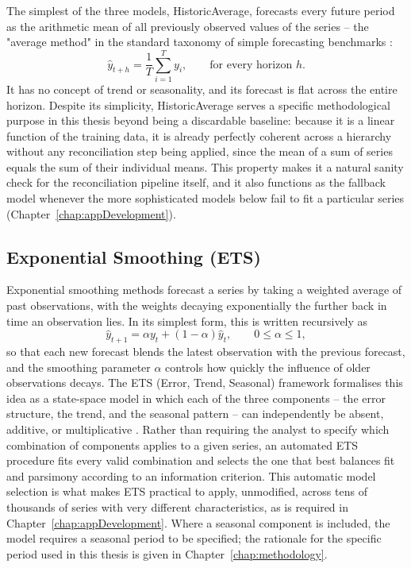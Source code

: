 The simplest of the three models, HistoricAverage, forecasts every future period as the arithmetic mean of all previously observed values of the series -- the "average method" in the standard taxonomy of simple forecasting benchmarks \cite{Hyndman:2018}:
\[
\hat{y}_{t+h} = \frac{1}{T}\sum_{i=1}^{T} y_i, \qquad \text{for every horizon } h.
\]
It has no concept of trend or seasonality, and its forecast is flat across the entire horizon. Despite its simplicity, HistoricAverage serves a specific methodological purpose in this thesis beyond being a discardable baseline: because it is a linear function of the training data, it is already perfectly coherent across a hierarchy without any reconciliation step being applied, since the mean of a sum of series equals the sum of their individual means. This property makes it a natural sanity check for the reconciliation pipeline itself, and it also functions as the fallback model whenever the more sophisticated models below fail to fit a particular series (Chapter~\ref{chap:appDevelopment}).

\subsection{Exponential Smoothing (ETS)}
\label{subsec:ets}

Exponential smoothing methods forecast a series by taking a weighted average of past observations, with the weights decaying exponentially the further back in time an observation lies. In its simplest form, this is written recursively as
\[
\hat{y}_{t+1} = \alpha y_t + (1-\alpha) \hat{y}_t , \qquad 0 \le \alpha \le 1,
\]
so that each new forecast blends the latest observation with the previous forecast, and the smoothing parameter $\alpha$ controls how quickly the influence of older observations decays. The ETS (Error, Trend, Seasonal) framework formalises this idea as a state-space model in which each of the three components -- the error structure, the trend, and the seasonal pattern -- can independently be absent, additive, or multiplicative \cite{Hyndman:2008}. Rather than requiring the analyst to specify which combination of components applies to a given series, an automated ETS procedure fits every valid combination and selects the one that best balances fit and parsimony according to an information criterion. This automatic model selection is what makes ETS practical to apply, unmodified, across tens of thousands of series with very different characteristics, as is required in Chapter~\ref{chap:appDevelopment}. Where a seasonal component is included, the model requires a seasonal period to be specified; the rationale for the specific period used in this thesis is given in Chapter~\ref{chap:methodology}.


